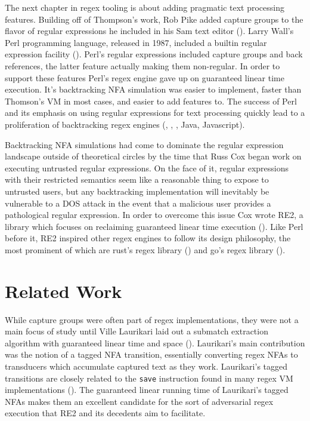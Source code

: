 The next chapter in regex tooling is about adding pragmatic text
processing features. Building off of Thompson's work,
Rob Pike added capture groups to the flavor of regular expressions
he included in his Sam text editor (\cite{Pike1987}). Larry Wall's
Perl programming language, released in 1987, included a builtin
regular expression facility (\cite{Perl}). Perl's regular
expressions included capture groups and back references, the
latter feature actually making them non-regular. In order to
support these features Perl's regex engine gave up on guaranteed
linear time execution. It's backtracking NFA
simulation was easier to implement, faster than Thomson's VM in most
cases, and easier to add features to. The success of Perl and its
emphasis on using regular expressions for text processing quickly
lead to a proliferation of backtracking regex engines (\cite{PCRE},
\cite{PCRE2}, \cite{Python}, Java, Javascript).

Backtracking NFA simulations had come to dominate the regular
expression landscape outside of theoretical circles by the
time that Russ Cox began work on executing untrusted regular
expressions. On the face of it, regular expressions with their
restricted semantics seem like a reasonable thing to expose to
untrusted users, but any backtracking implementation will inevitably
be vulnerable to a DOS attack in the event that a malicious user
provides a pathological regular expression. In order to
overcome this issue Cox wrote RE2, a library
which focuses on reclaiming guaranteed linear time execution (\cite{CoxRE2}).
Like Perl before it, RE2 inspired other regex engines to
follow its design philosophy, the most prominent of which are
rust's regex library (\cite{GallantRegex}) and go's regex library
(\cite{GoLang}).

\section{Related Work}

While capture groups were often part of regex implementations,
they were not a main focus of study until Ville Laurikari laid
out a submatch extraction algorithm with guaranteed linear time
and space (\cite{Laurikari2001}). Laurikari's main contribution
was the notion of a tagged NFA transition, essentially converting
regex NFAs to transducers which accumulate captured text as they
work. Laurikari's tagged transitions are closely related to the
\verb'save' instruction found in many regex VM implementations
(\cite{CoxVirtualMachineApproach}). The guaranteed linear
running time of Laurikari's tagged NFAs makes them an excellent
candidate for the sort of adversarial regex execution that RE2
and its decedents aim to facilitate.

